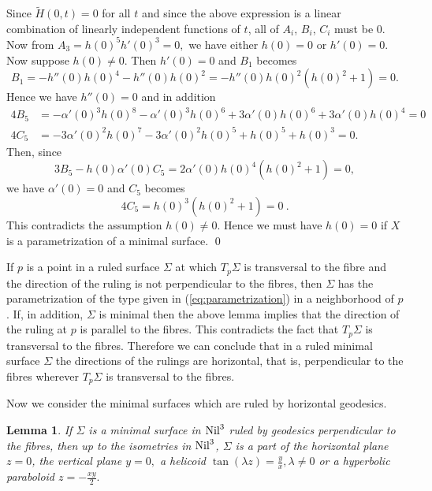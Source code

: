 \documentclass[11pt]{amsart}
\newtheorem{lemma}[prop]{Lemma}
\begin{document}
Since $\tilde H (0,t)=0 $ for all $t$ and since the above
expression is a linear combination of linearly independent
functions of $t$, all of $A_i$, $B_i$, $C_i$ must be $0$. Now from
$A_3 = h(0)^5 h'(0)^3 =0,$ we have either $h(0)=0 $ or  $h'(0)=0$.
Now suppose $h(0)\neq 0.$ Then  $h'(0)=0$ and $B_1$ becomes
\[
  B_1 = -h''(0) h(0)^4 -h''(0) h(0)^2 =-h''(0) h(0)^2(h(0)^2 + 1)= 0 .
\]
Hence we have $h''(0)= 0$ and  in addition
\[   \begin{split}
  4B_5 &=-\alpha'(0)^3 h(0)^8-\alpha'(0)^3 h(0)^6+3 \alpha'(0) h(0)^6 +3 \alpha'(0) h(0)^4 =0\\
  4C_5 &=-3 \alpha'(0)^2 h(0)^7-3 \alpha'(0)^2 h(0)^5+h(0)^5 +h(0)^3 =0  .
\end{split}     \]
Then, since
  $$ 3B_5 -  h(0) \alpha'(0) C_5 =2 \alpha'(0) h(0)^4(h(0)^2 +1)= 0 ,$$
we have $\alpha'(0) =0 $ and $C_5$ becomes
 $$ 4C_5 =h(0)^3(h(0)^2+1) =0 \ .$$
This contradicts the assumption $h(0)\ne0$. Hence we must have
$h(0)=0$ if $X$ is a parametrization of a minimal surface. \qed

\medskip

If $p$ is a point in a ruled surface $\Sigma$ at which $T_p
\Sigma$ is transversal to the fibre and the direction of the
ruling is not perpendicular to the fibres, then $\Sigma$ has the
parametrization of the type given in (\ref{eq:parametrization}) in
a neighborhood of $p$.  If, in addition, $\Sigma$ is minimal then
the above lemma implies that the direction of the ruling at $p$ is
parallel to the fibres.  This contradicts the fact that $T_p
\Sigma$ is transversal to the fibres. Therefore we can conclude
that in a ruled minimal surface $\Sigma$ the directions of the
rulings are horizontal, that is, perpendicular to the fibres
wherever $T_p \Sigma$ is transversal to the fibres.

\medskip

Now we consider the minimal surfaces which are ruled by horizontal
geodesics.

\begin{lemma}\label{lem:horzontalyruled}
If $\Sigma$ is a minimal surface in $\text{\rm Nil}^3$ ruled by
geodesics perpendicular to the  fibres, then up to the isometries
in $\text{\rm Nil}^3$, $\Sigma$ is a part of the horizontal plane
$z=0$, the vertical plane $y=0,$ a helicoid $\tan(\lambda
z)=\frac{y}{x}, \lambda\ne 0$ or a hyperbolic paraboloid
$z=-\frac{xy}2.$
\end{lemma}
\end{document}
